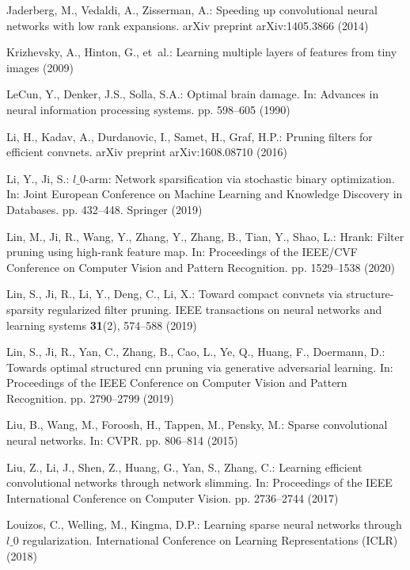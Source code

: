 \documentclass[runningheads, envcountsame, a4paper]{llncs}
\begin{document}
\begin{thebibliography}{10}
  Jaderberg, M., Vedaldi, A., Zisserman, A.: Speeding up convolutional neural
    networks with low rank expansions. arXiv preprint arXiv:1405.3866  (2014)
  
  Krizhevsky, A., Hinton, G., et~al.: Learning multiple layers of features from
    tiny images  (2009)
  
  LeCun, Y., Denker, J.S., Solla, S.A.: Optimal brain damage. In: Advances in
    neural information processing systems. pp. 598--605 (1990)
  
  Li, H., Kadav, A., Durdanovic, I., Samet, H., Graf, H.P.: Pruning filters for
    efficient convnets. arXiv preprint arXiv:1608.08710  (2016)
  
  Li, Y., Ji, S.: $ l\_0 $-arm: Network sparsification via stochastic binary
    optimization. In: Joint European Conference on Machine Learning and Knowledge
    Discovery in Databases. pp. 432--448. Springer (2019)
  
  Lin, M., Ji, R., Wang, Y., Zhang, Y., Zhang, B., Tian, Y., Shao, L.: Hrank:
    Filter pruning using high-rank feature map. In: Proceedings of the IEEE/CVF
    Conference on Computer Vision and Pattern Recognition. pp. 1529--1538 (2020)
  
  Lin, S., Ji, R., Li, Y., Deng, C., Li, X.: Toward compact convnets via
    structure-sparsity regularized filter pruning. IEEE transactions on neural
    networks and learning systems  \textbf{31}(2),  574--588 (2019)
  
  Lin, S., Ji, R., Yan, C., Zhang, B., Cao, L., Ye, Q., Huang, F., Doermann, D.:
    Towards optimal structured cnn pruning via generative adversarial learning.
    In: Proceedings of the IEEE Conference on Computer Vision and Pattern
    Recognition. pp. 2790--2799 (2019)
  
  Liu, B., Wang, M., Foroosh, H., Tappen, M., Pensky, M.: Sparse convolutional
    neural networks. In: CVPR. pp. 806--814 (2015)
  
  Liu, Z., Li, J., Shen, Z., Huang, G., Yan, S., Zhang, C.: Learning efficient
    convolutional networks through network slimming. In: Proceedings of the IEEE
    International Conference on Computer Vision. pp. 2736--2744 (2017)
  
  Louizos, C., Welling, M., Kingma, D.P.: Learning sparse neural networks through
    $ l\_0 $ regularization. International Conference on Learning Representations
    (ICLR)  (2018)
  

\end{thebibliography}
\end{document}
